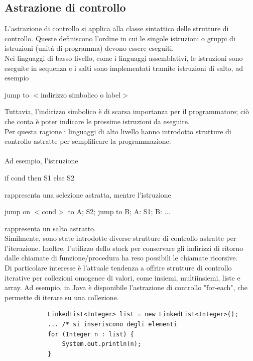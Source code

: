 \documentclass{article}
\begin{document}
	\subsection{Astrazione di controllo}
	L'astrazione di controllo si applica alla classe sintattica delle strutture di controllo. Queste definiscono l'ordine in cui le singole istruzioni o gruppi di istruzioni (unità di programma) devono essere eseguiti.
	\vspace{\baselineskip} \\
	Nei linguaggi di basso livello, come i linguaggi assemblativi, le istruzioni sono eseguite in sequenza e i salti sono implementati tramite istruzioni di salto, ad esempio 
	\begin{center}jump to $<$indirizzo simbolico o label$>$\end{center}
	Tuttavia, l'indirizzo simbolico è di scarsa importanza per il programmatore; ciò che conta è poter indicare le prossime istruzioni da eseguire.
	\vspace{\baselineskip} \\
	Per questa ragione i linguaggi di alto livello hanno introdotto strutture di controllo astratte per semplificare la programmazione.\\\\
	Ad esempio, l'istruzione
	\begin{center}if cond then S1 else S2\end{center}
	rappresenta una selezione astratta, mentre l'istruzione
	\begin{center}jump on $<$cond$>$ to A; S2; jump to B; A: S1; B: ...\end{center}
	rappresenta un salto astratto.
	\vspace{\baselineskip} \\
	Similmente, sono state introdotte diverse strutture di controllo astratte per l'iterazione. Inoltre, l'utilizzo dello stack per conservare gli indirizzi di ritorno dalle chiamate di funzione/procedura ha reso possibili le chiamate ricorsive.
	\vspace{\baselineskip} \\
	Di particolare interesse è l'attuale tendenza a offrire strutture di controllo iterative per collezioni omogenee di valori, come insiemi, multiinsiemi, liste e array. Ad esempio, in Java è disponibile l'astrazione di controllo "for-each", che permette di iterare su una collezione.
	\begin{center}
		\begin{verbatim}
			LinkedList<Integer> list = new LinkedList<Integer>();
			... /* si inseriscono degli elementi
			for (Integer n : list) {
				System.out.println(n);
			}
		\end{verbatim}
	\end{center}
\end{document}
